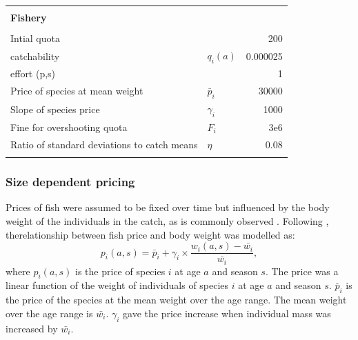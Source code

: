 \documentclass[12pt,oneline,a4paper,numbib]{ouparticle}
\numberwithin{equation}{subsection} %
\begin{document}
\begin{table}[!h]
{\begin{tabular}{@{}llr@{}}
&                 \\  
\textbf{Fishery }                                           &             \\ \hline   
&  \\%

Intial quota                                                &                       & 200 \\%
catchability                                                & $q_i (a)$             & 0.000025        \\ 
effort (p,s)                                                &                       & 1                 \\ 
Price of species at mean weight                             & $\bar{p}_i$           & 30000             \\
Slope of species price                                      & $\gamma_i$            & 1000            \\
Fine for overshooting quota                                 &  $F_i$                & 3e6              \\
Ratio of standard deviations to catch means                 & $\eta$                & 0.08           \\ 
&                 \\  \hline%
\end{tabular}
}
\end{table}

\subsubsection{Size dependent pricing}

Prices of fish were assumed to be fixed over time but influenced by the body weight of the individuals in the catch, as is commonly observed \cite{Zimmermann2011, Zimmermann2013}. Following \cite{Zimmermann2011}, therelationship between fish price and body weight was modelled as:  
\begin{equation}
 p_i (a,s) = \bar{p}_i + \gamma_i \times \frac{w_i (a,s) -\bar{w_i}}{\bar{w_i}},
\end{equation}
where $p_i (a,s) $ is the price of species $i$ at age $a$ and season $s$. The price was a linear function of the weight of individuals of species $i$ at age $a$ and season $s$. $\bar{p}_i$ is the price of the species at the mean weight over the age range. The mean weight over the age range is $\bar{w_i}$. $\gamma_i$ gave the price increase when individual mass was increased by $\bar{w_i}$. 
\end{document}
